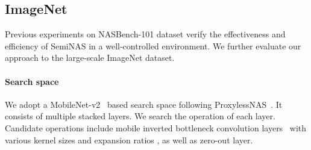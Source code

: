 \documentclass{article}
\begin{document}
\subsection{ImageNet}
Previous experiments on NASBench-101 dataset verify the effectiveness and efficiency of SemiNAS in a well-controlled environment. We further evaluate our approach to the large-scale ImageNet dataset.

\paragraph{Search space} We adopt a MobileNet-v2~\cite{mobilenetv2} based search space following ProxylessNAS~\cite{proxylessnas}. It consists of multiple stacked layers. We search the operation of each layer. Candidate operations include mobile inverted bottleneck convolution layers~\cite{mobilenetv2} with various kernel sizes  and expansion ratios , as well as zero-out layer.
\end{document}
